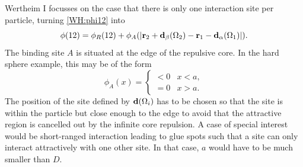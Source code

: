 \documentclass[8.5pt,twoside,twocolumn]{article}
\renewcommand\r{\bo r}
\theoremstyle{standard}
\begin{document}
Wertheim I focusses on the case that there is only one interaction site per particle, turning
\eqref{WH:phi12} into
\begin{equation}
\phi(12)=\phi_R(12) + \phi_A(\abs{\r_2+\bo d_\be(\Om_2)-\r_1-\bo d_\al(\Om_1)}).
\label{WH:phi12_OneSite}
\end{equation}
The binding site $A$ is situated at the edge of the repulsive core. In the hard sphere example,
this may be of the form
\begin{equation}
\phi_A(x)=\begin{cases}
<0 &x<a,\\
=0 &x>a.
\end{cases}
\end{equation}
The position of the site defined by $\mathbf{d}(\Omega_i)$ has to be chosen so that the site is within the
particle but close enough to the edge to avoid that the attractive region is cancelled out by the
infinite core repulsion. A case of special interest would be short-ranged interaction leading to
glue spots such that a site can only interact attractively with one other site. In that case,
$a$ would have to be much smaller than $D$.
\end{document}
